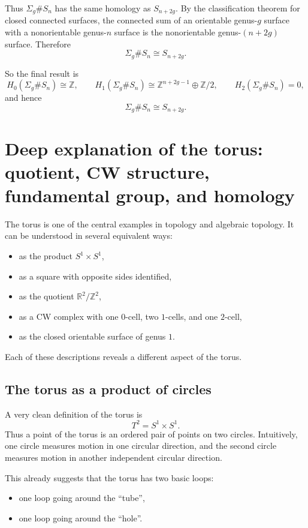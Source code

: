 \documentclass[12pt,a4paper]{article}
\theoremstyle{notespace}
\begin{document}
Thus \(\Sigma_g\# S_n\) has the same homology as \(S_{n+2g}\). By the classification theorem for closed connected surfaces, the connected sum of an orientable genus-\(g\) surface with a nonorientable genus-\(n\) surface is the nonorientable genus-\((n+2g)\) surface. Therefore
\[
\Sigma_g\# S_n\cong S_{n+2g}.
\]

So the final result is
\[
H_0(\Sigma_g\# S_n)\cong \mathbb Z,
\qquad
H_1(\Sigma_g\# S_n)\cong \mathbb Z^{n+2g-1}\oplus \mathbb Z/2,
\qquad
H_2(\Sigma_g\# S_n)=0,
\]
and hence
\[
\boxed{\Sigma_g\# S_n\cong S_{n+2g}.}
\]

\section{Deep explanation of the torus: quotient, CW structure, fundamental group, and homology}

The torus is one of the central examples in topology and algebraic topology. It can be understood in several equivalent ways:

\begin{itemize}
	\item as the product \(S^1\times S^1\),
	\item as a square with opposite sides identified,
	\item as the quotient \(\mathbb R^2/\mathbb Z^2\),
	\item as a CW complex with one \(0\)-cell, two \(1\)-cells, and one \(2\)-cell,
	\item as the closed orientable surface of genus \(1\).
\end{itemize}

Each of these descriptions reveals a different aspect of the torus.

\subsection{The torus as a product of circles}

A very clean definition of the torus is
\[
T^2=S^1\times S^1.
\]
Thus a point of the torus is an ordered pair of points on two circles. Intuitively, one circle measures motion in one circular direction, and the second circle measures motion in another independent circular direction.

This already suggests that the torus has two basic loops:

\begin{itemize}
	\item one loop going around the ``tube'',
	\item one loop going around the ``hole''.
\end{itemize}
\end{document}
